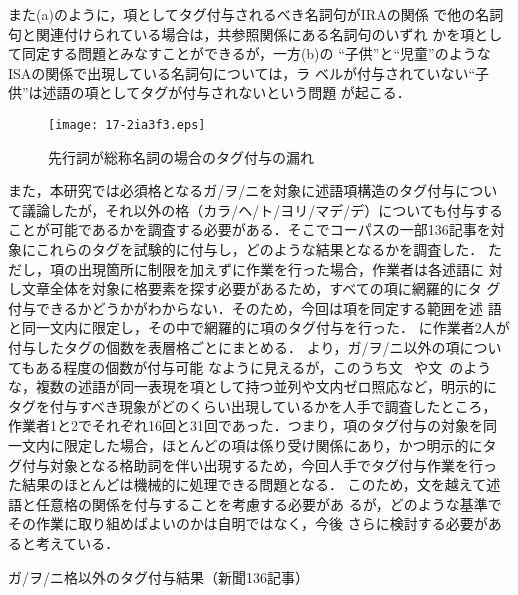 \documentclass[japanese]{jnlp_1.4}
\def\fig#1{}
\def\tab#1{}
\begin{document}
また\fig{lack}(a)のように，項としてタグ付与されるべき名詞句がIRAの関係
で他の名詞句と関連付けられている場合は，共参照関係にある名詞句のいずれ
かを項として同定する問題とみなすことができるが，一方\fig{lack}(b)の
``子供''と``児童''のようなISAの関係で出現している名詞句については，ラ
ベルが付与されていない``子供''は述語の項としてタグが付与されないという問題
が起こる．

\begin{figure}[b]
\begin{center}
  \texttt{[image: 17-2ia3f3.eps]}
\end{center}
  \caption{先行詞が総称名詞の場合のタグ付与の漏れ}
  \label{fig:lack}
\end{figure}


また，本研究では必須格となるガ/ヲ/ニを対象に述語項構造のタグ付与につい
て議論したが，それ以外の格（カラ/ヘ/ト/ヨリ/マデ/デ）についても付与する
ことが可能であるかを調査する必要がある．そこでコーパスの一部136記事を対
象にこれらのタグを試験的に付与し，どのような結果となるかを調査した．
ただし，項の出現箇所に制限を加えずに作業を行った場合，作業者は各述語に
対し文章全体を対象に格要素を探す必要があるため，すべての項に網羅的にタ
グ付与できるかどうかがわからない．そのため，今回は項を同定する範囲を述
語と同一文内に限定し，その中で網羅的に項のタグ付与を行った．
\tab{adjunct}に作業者2人が付与したタグの個数を表層格ごとにまとめる．
\tab{adjunct}より，ガ/ヲ/ニ以外の項についてもある程度の個数が付与可能
なように見えるが，このうち文~ や文~のよう
な，複数の述語が同一表現を項として持つ並列や文内ゼロ照応など，明示的に
タグを付与すべき現象がどのくらい出現しているかを人手で調査したところ，
作業者1と2でそれぞれ16回と31回であった．つまり，項のタグ付与の対象を同
一文内に限定した場合，ほとんどの項は係り受け関係にあり，かつ明示的にタ
グ付与対象となる格助詞を伴い出現するため，今回人手でタグ付与作業を行っ
た結果のほとんどは機械的に処理できる問題となる．
このため，文を越えて述語と任意格の関係を付与することを考慮する必要があ
るが，どのような基準でその作業に取り組めばよいのかは自明ではなく，今後
さらに検討する必要があると考えている．

\begin{table}[t]
  \caption{ガ/ヲ/ニ格以外のタグ付与結果（新聞136記事）}
  \label{tab:adjunct}

\end{table}
\end{document}
